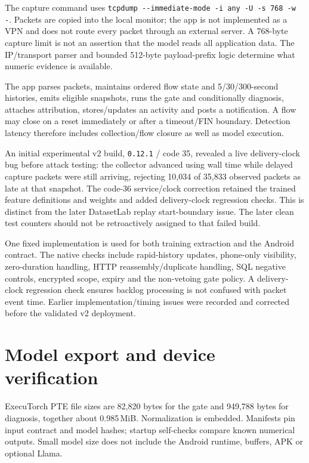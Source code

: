 \documentclass[11pt,a4paper,oneside]{report}
\newcommand{\code}[1]{\nolinkurl{#1}}
\begin{document}
The capture command uses \code{tcpdump --immediate-mode -i any -U -s 768 -w -}. Packets are copied into the local monitor; the app is not implemented as a VPN and does not route every packet through an external server. A 768-byte capture limit is not an assertion that the model reads all application data. The IP/transport parser and bounded 512-byte payload-prefix logic determine what numeric evidence is available.

The app parses packets, maintains ordered flow state and 5/30/300-second histories, emits eligible snapshots, runs the gate and conditionally diagnosis, attaches attribution, stores/updates an activity and posts a notification. A flow may close on a reset immediately or after a timeout/FIN boundary. Detection latency therefore includes collection/flow closure as well as model execution.

An initial experimental v2 build, \code{0.12.1} / code 35, revealed a live delivery-clock bug before attack testing: the collector advanced using wall time while delayed capture packets were still arriving, rejecting 10,034 of 35,833 observed packets as late at that snapshot. The code-36 service/clock correction retained the trained feature definitions and weights and added delivery-clock regression checks. This is distinct from the later DatasetLab replay start-boundary issue. The later clean test counters should not be retroactively assigned to that failed build.

One fixed implementation is used for both training extraction and the Android contract. The native checks include rapid-history updates, phone-only visibility, zero-duration handling, HTTP reassembly/duplicate handling, SQL negative controls, encrypted scope, expiry and the non-vetoing gate policy. A delivery-clock regression check ensures backlog processing is not confused with packet event time. Earlier implementation/timing issues were recorded and corrected before the validated v2 deployment.

\section{Model export and device verification}
ExecuTorch PTE file sizes are 82,820 bytes for the gate and 949,788 bytes for diagnosis, together about 0.985\,MiB. Normalization is embedded. Manifests pin input contract and model hashes; startup self-checks compare known numerical outputs. Small model size does not include the Android runtime, buffers, APK or optional Llama.
\end{document}
